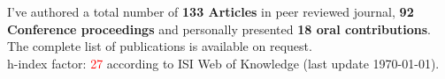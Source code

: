 I've authored a total number of \textbf{133 Articles} in peer reviewed journal,
\textbf{92 Conference proceedings} and personally presented \textbf{18 oral
contributions}. The complete list of publications is available on
request.  \\
h-index factor: \textcolor{red}{27} according to ISI Web of Knowledge
(last update \today). 

\begin{multicols}{2}
\setlength\bibitemsep{0pt}
\printbibliography[type=article,  title = {Cited publications}, heading=subbibliography, prefixnumbers={A}, resetnumbers=true]
\end{multicols}

